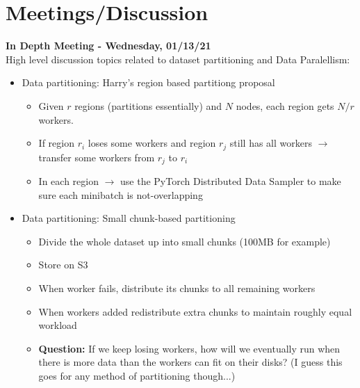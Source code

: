\chapter{Meetings/Discussion}
\label{ch:meetings}

\textbf{In Depth Meeting - Wednesday, 01/13/21} \\
High level discussion topics related to dataset partitioning and Data Paralellism:
\begin{itemize}
    \item Data partitioning: Harry's region based partitiong proposal
    \begin{itemize}
        \item Given $r$ regions (partitions essentially) and $N$ nodes, each
          region gets $N/r$ workers.
        \item If region $r_i$ loses some workers and region $r_j$ still has all
          workers $\rightarrow$ transfer some workers from $r_j$ to $r_i$
        \item In each region $\rightarrow$ use the PyTorch Distributed Data Sampler
          to make sure each minibatch is not-overlapping
    \end{itemize}

    \item Data partitioning: Small chunk-based partitioning
    \begin{itemize}
        \item Divide the whole dataset up into small chunks (100MB for example)
        \item Store on S3
        \item When worker fails, distribute its chunks to all remaining workers
        \item When workers added redistribute extra chunks to maintain roughly equal
          workload
        \item \textbf{Question:} If we keep losing workers, how will we eventually run
          when there is more data than the workers can fit on their disks? (I guess
          this goes for any method of partitioning though...)
    \end{itemize}
\end{itemize}

